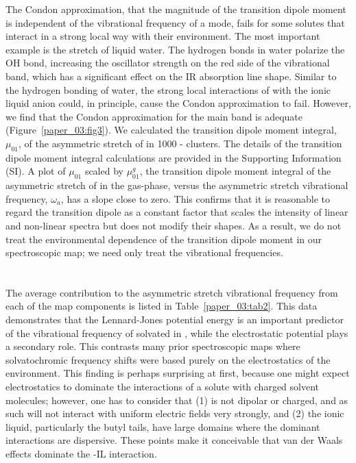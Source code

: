 \documentclass[%
  class = book,%
  crop = false,%
  float = true,%
  multi = true,%
  preview = false,%
]{standalone}
\begin{document}
The Condon approximation, that the magnitude of the transition dipole moment is independent of the vibrational frequency of a mode, fails for some solutes that interact in a strong local way with their environment. The most important example is the  stretch of liquid water. The hydrogen bonds in water polarize the OH bond, increasing the oscillator strength on the red side of the vibrational band, which has a significant effect on the IR absorption line shape.\cite{corcelliJPCA-05,schmidt_pronounced_2005-1,loparoCP-07} Similar to the hydrogen bonding of water, the strong local interactions of  with the ionic liquid anion could, in principle, cause the Condon approximation to fail. However, we find that the Condon approximation for the main band is adequate (Figure~\ref{paper_03:fig3}). We calculated the transition dipole moment integral, \(\mu_{01}\), of the asymmetric stretch of  in \num{1000} -\ce{[C4C1im][PF6]} clusters. The details of the transition dipole moment integral calculations are provided in the Supporting Information (SI). A plot of \(\mu_{01}\) scaled by \(\mu_{01}^{g}\), the transition dipole moment integral of the asymmetric stretch of  in the gas-phase, versus the asymmetric stretch vibrational frequency, \(\omega_{a}\), has a slope close to zero. This confirms that it is reasonable to regard the transition dipole as a constant factor that scales the intensity of linear and non-linear spectra but does not modify their shapes. As a result, we do not treat the environmental dependence of the transition dipole moment in our spectroscopic map; we need only treat the vibrational frequencies.

\section{\texorpdfstring{}{Physical Interpretation of the Spectroscopic Map}}
\label{paper_03:sec:IV}

The average contribution to the  asymmetric stretch vibrational frequency from each of the map components is listed in Table~\ref{paper_03:tab2}. This data demonstrates that the Lennard-Jones potential energy is an important predictor of the vibrational frequency of  solvated in \ce{[C4C1im][PF6]}, while the electrostatic potential plays a secondary role. This contrasts many prior spectroscopic maps where solvatochromic frequency shifts were based purely on the electrostatics of the environment.\cite{lin_water_2009-1,ohJCP-08,Miller2009} This finding is perhaps surprising at first, because one might expect electrostatics to dominate the interactions of a solute with charged solvent molecules; however, one has to consider that (1)  is not dipolar or charged, and as such will not interact with uniform electric fields very strongly, and (2) the ionic liquid, particularly the \ce{[C4C1im]+} butyl tails, have large domains where the dominant interactions are dispersive. These points make it conceivable that van der Waals effects dominate the -IL interaction.
\end{document}
